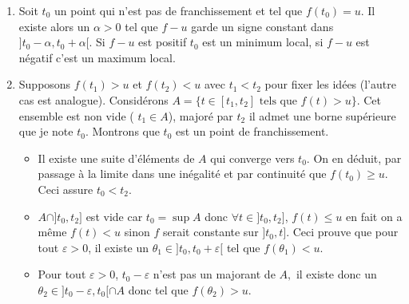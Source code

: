 \begin{enumerate}
  \item  Soit $t_{0}$ un point qui n'est pas de franchissement et tel que $f(t_{0})=u$. Il existe alors un $\alpha >0$ tel que $f-u$ garde un
signe constant dans $] t_{0}-\alpha ,t_{0}+\alpha [ $. Si $f-u$ est positif $t_{0}$ est un minimum local, si $f-u$ est n{\'e}gatif c'est un maximum local.

  \item  Supposons $f(t_{1})>u$ et $f(t_{2})<u$ avec $t_{1}<t_{2}$ pour fixer les id{\'e}es (l'autre cas est analogue). Consid{\'e}rons
$A=\{ t\in [ t_{1},t_{2}] \text{ tels que }f(t)>u\} $. Cet ensemble est non vide ( $t_{1}\in A$), major{\'e} par $t_{2}$ il admet une borne sup{\'e}rieure que je note $t_{0}$. Montrons que
$t_{0}$ est un point de franchissement.

  \begin{itemize}
    \item  Il existe une suite d'{\'e}l{\'e}ments de $A$ qui converge vers $t_{0}.$ On en d{\'e}duit, par passage {\`a} la limite dans une
in{\'e}galit{\'e} et par continuit{\'e} que $f(t_{0})\geq u$. Ceci assure $t_{0}<t_{2}$.

    \item  $A\cap ] t_{0},t_{2}] $ est vide car $t_{0}=\sup A$ donc $\forall t\in ] t_{0},t_{2}] $, $f(t)\leq u$ en fait on a m{\^e}me
    $f(t)<u$ sinon $f$ serait constante sur $] t_{0},t] $. Ceci prouve que pour tout $\varepsilon >0$, il existe un
    $\theta _{1}\in ]t_{0},t_{0}+\varepsilon [ $ tel que $f(\theta _{1})<u$.

    \item  Pour tout $\varepsilon >0$, $t_{0}-\varepsilon $ n'est pas un majorant de $A,$ il existe donc un $\theta _{2}\in ]t_{0}-\varepsilon ,t_{0}[ \cap A$ donc tel que
    $f(\theta _{2})>u$.
  \end{itemize}
\end{enumerate}

